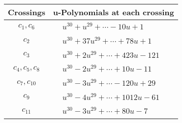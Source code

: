 \documentclass[1p]{elsarticle_modified}
\theoremstyle{definition}
\begin{document}
\begin{tabular}{m{50pt}|m{274pt}}
Crossings & \hspace{64pt}u-Polynomials at each crossing \\
\hline $$\begin{aligned}c_{1},c_{6}\end{aligned}$$&$\begin{aligned}
&u^{30}+u^{29}+\cdots-10 u+1
\end{aligned}$\\
\hline $$\begin{aligned}c_{2}\end{aligned}$$&$\begin{aligned}
&u^{30}+37 u^{29}+\cdots+78 u+1
\end{aligned}$\\
\hline $$\begin{aligned}c_{3}\end{aligned}$$&$\begin{aligned}
&u^{30}+2 u^{29}+\cdots+423 u-121
\end{aligned}$\\
\hline $$\begin{aligned}c_{4},c_{5},c_{8}\end{aligned}$$&$\begin{aligned}
&u^{30}-2 u^{29}+\cdots+10 u-11
\end{aligned}$\\
\hline $$\begin{aligned}c_{7},c_{10}\end{aligned}$$&$\begin{aligned}
&u^{30}-3 u^{29}+\cdots-120 u+29
\end{aligned}$\\
\hline $$\begin{aligned}c_{9}\end{aligned}$$&$\begin{aligned}
&u^{30}-4 u^{29}+\cdots+1012 u-61
\end{aligned}$\\
\hline $$\begin{aligned}c_{11}\end{aligned}$$&$\begin{aligned}
&u^{30}-3 u^{29}+\cdots+80 u-7
\end{aligned}$\\
\hline
\end{tabular}\\~\\
\newpage\renewcommand{\arraystretch}{1}
\end{document}

